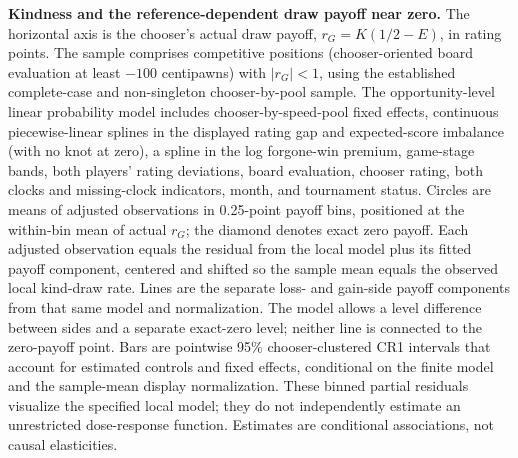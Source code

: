 \caption{\textbf{Kindness and the reference-dependent draw payoff near zero.}
The horizontal axis is the chooser's actual draw payoff,
$r_G=K(1/2-E)$, in rating points. The sample comprises competitive positions
(chooser-oriented board evaluation at least $-100$ centipawns) with $|r_G|<1$,
using the established complete-case and non-singleton chooser-by-pool sample.
The opportunity-level linear probability model includes chooser-by-speed-pool
fixed effects, continuous piecewise-linear splines in the displayed rating gap
and expected-score imbalance (with no knot at zero), a spline in the log
forgone-win premium, game-stage bands, both players' rating deviations, board
evaluation, chooser rating, both clocks and missing-clock indicators, month,
and tournament status.
Circles are means of adjusted observations in 0.25-point payoff bins,
positioned at the within-bin mean of actual $r_G$; the diamond denotes exact
zero payoff. Each adjusted observation equals the residual from the local
model plus its fitted payoff component, centered and shifted so the sample
mean equals the observed local kind-draw rate. Lines are the separate loss-
and gain-side payoff components from that same model and normalization.
The model allows a level difference between sides and a separate exact-zero
level; neither line is connected to the zero-payoff point. Bars are pointwise
95\% chooser-clustered CR1 intervals that account for estimated controls and
fixed effects, conditional on the finite model and the sample-mean display
normalization. These binned partial residuals visualize the specified local
model; they do not independently estimate an unrestricted dose-response
function. Estimates are conditional associations, not causal elasticities.}
